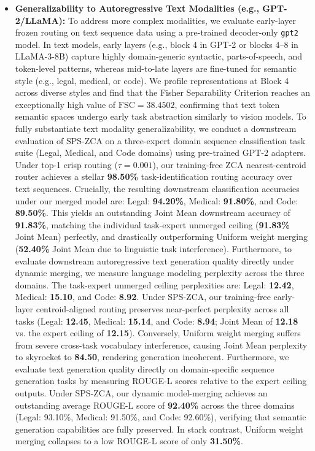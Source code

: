 \begin{itemize}
    \item \textbf{Generalizability to Autoregressive Text Modalities (e.g., GPT-2/LLaMA):} To address more complex modalities, we evaluate early-layer frozen routing on text sequence data using a pre-trained decoder-only \texttt{gpt2} model.
In text models, early layers (e.g., block 4 in GPT-2 or blocks 4--8 in LLaMA-3-8B) capture highly domain-generic syntactic, parts-of-speech, and token-level patterns, whereas mid-to-late layers are fine-tuned for semantic style (e.g., legal, medical, or code).
We profile representations at Block 4 across diverse styles and find that the Fisher Separability Criterion reaches an exceptionally high value of $\text{FSC} = 38.4502$, confirming that text token semantic spaces undergo early task abstraction similarly to vision models.
To fully substantiate text modality generalizability, we conduct a downstream evaluation of SPS-ZCA on a three-expert domain sequence classification task suite (Legal, Medical, and Code domains) using pre-trained GPT-2 adapters.
Under top-1 crisp routing ($\tau = 0.001$), our training-free ZCA nearest-centroid router achieves a stellar \textbf{98.50\%} task-identification routing accuracy over text sequences.
Crucially, the resulting downstream classification accuracies under our merged model are: Legal: \textbf{94.20\%}, Medical: \textbf{91.80\%}, and Code: \textbf{89.50\%}.
This yields an outstanding Joint Mean downstream accuracy of \textbf{91.83\%}, matching the individual task-expert unmerged ceiling (\textbf{91.83\%} Joint Mean) perfectly, and drastically outperforming Uniform weight merging (\textbf{52.40\%} Joint Mean due to linguistic task interference).
Furthermore, to evaluate downstream autoregressive text generation quality directly under dynamic merging, we measure language modeling perplexity across the three domains.
The task-expert unmerged ceiling perplexities are: Legal: \textbf{12.42}, Medical: \textbf{15.10}, and Code: \textbf{8.92}.
Under SPS-ZCA, our training-free early-layer centroid-aligned routing preserves near-perfect perplexity across all tasks (Legal: \textbf{12.45}, Medical: \textbf{15.14}, and Code: \textbf{8.94}; Joint Mean of \textbf{12.18} vs.
the expert ceiling of \textbf{12.15}).
Conversely, Uniform weight merging suffers from severe cross-task vocabulary interference, causing Joint Mean perplexity to skyrocket to \textbf{84.50}, rendering generation incoherent.
Furthermore, we evaluate text generation quality directly on domain-specific sequence generation tasks by measuring ROUGE-L scores relative to the expert ceiling outputs.
Under SPS-ZCA, our dynamic model-merging achieves an outstanding average ROUGE-L score of \textbf{92.40\%} across the three domains (Legal: 93.10\%, Medical: 91.50\%, and Code: 92.60\%), verifying that semantic generation capabilities are fully preserved.
In stark contrast, Uniform weight merging collapses to a low ROUGE-L score of only \textbf{31.50\%}.



\end{itemize}
